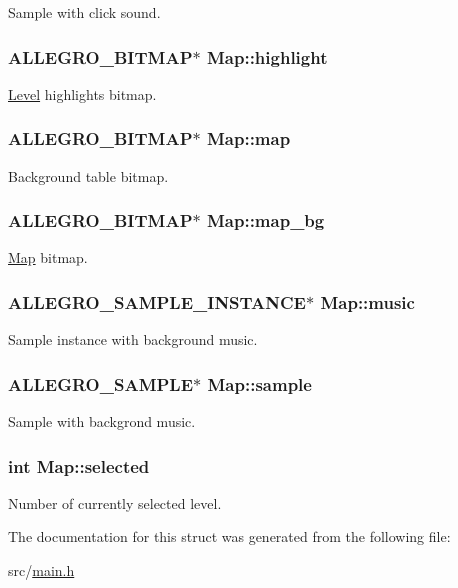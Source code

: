 \-Sample with click sound. \hypertarget{structMap_a703b41e358b7c8ff39bf0d8dd37bb408}{
\subsubsection[{highlight}]{\setlength{\rightskip}{0pt plus 5cm}\-A\-L\-L\-E\-G\-R\-O\-\_\-\-B\-I\-T\-M\-A\-P$\ast$ {\bf \-Map\-::highlight}}}\label{structMap_a703b41e358b7c8ff39bf0d8dd37bb408}
\hyperlink{structLevel}{\-Level} highlights bitmap. \hypertarget{structMap_abaf70186fbb2b4b047b8350e3ec5347c}{
\subsubsection[{map}]{\setlength{\rightskip}{0pt plus 5cm}\-A\-L\-L\-E\-G\-R\-O\-\_\-\-B\-I\-T\-M\-A\-P$\ast$ {\bf \-Map\-::map}}}\label{structMap_abaf70186fbb2b4b047b8350e3ec5347c}
\-Background table bitmap. \hypertarget{structMap_ac0b084971832b4466a9d91233452378d}{
\subsubsection[{map\-\_\-bg}]{\setlength{\rightskip}{0pt plus 5cm}\-A\-L\-L\-E\-G\-R\-O\-\_\-\-B\-I\-T\-M\-A\-P$\ast$ {\bf \-Map\-::map\-\_\-bg}}}\label{structMap_ac0b084971832b4466a9d91233452378d}
\hyperlink{structMap}{\-Map} bitmap. \hypertarget{structMap_a17ae4f61c1209816b26940d1c8a88f68}{
\subsubsection[{music}]{\setlength{\rightskip}{0pt plus 5cm}\-A\-L\-L\-E\-G\-R\-O\-\_\-\-S\-A\-M\-P\-L\-E\-\_\-\-I\-N\-S\-T\-A\-N\-C\-E$\ast$ {\bf \-Map\-::music}}}\label{structMap_a17ae4f61c1209816b26940d1c8a88f68}
\-Sample instance with background music. \hypertarget{structMap_a3334bc47109df8757b77c9d3bf67ec5f}{
\subsubsection[{sample}]{\setlength{\rightskip}{0pt plus 5cm}\-A\-L\-L\-E\-G\-R\-O\-\_\-\-S\-A\-M\-P\-L\-E$\ast$ {\bf \-Map\-::sample}}}\label{structMap_a3334bc47109df8757b77c9d3bf67ec5f}
\-Sample with backgrond music. \hypertarget{structMap_a07b3269191a003d517977da3adc7f0a4}{
\subsubsection[{selected}]{\setlength{\rightskip}{0pt plus 5cm}int {\bf \-Map\-::selected}}}\label{structMap_a07b3269191a003d517977da3adc7f0a4}
\-Number of currently selected level. 

\-The documentation for this struct was generated from the following file\-:\begin{DoxyCompactItemize}
\item 
src/\hyperlink{main_8h}{main.\-h}\end{DoxyCompactItemize}
